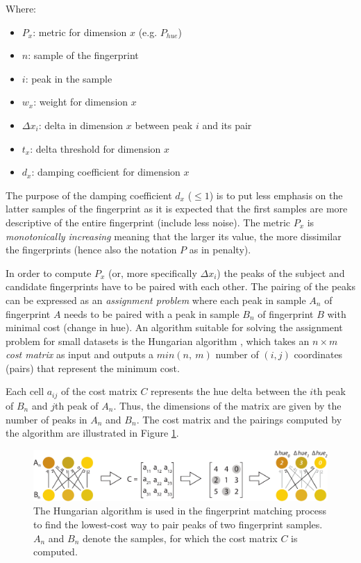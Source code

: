 \documentclass[thesis.tex]{subfiles}
\begin{document}
Where:
\begin{itemize}[label=]
    \item $P_x$: metric for dimension $x$ (e.g. $P_{hue}$)
    \item $n$: sample of the fingerprint
    \item $i$: peak in the sample
    \item $w_x$: weight for dimension $x$
    \item $\Delta{x_i}$: delta in dimension $x$ between peak $i$ and its pair
    \item $t_x$: delta threshold for dimension $x$
    \item $d_x$: damping coefficient for dimension $x$
\end{itemize}

\noindent The purpose of the damping coefficient $d_x$ ($\leq 1$) is to put less emphasis on the latter samples of the fingerprint as it is expected that the first samples are more descriptive of the entire fingerprint (include less noise). The metric $P_x$ is \emph{monotonically increasing} meaning that the larger its value, the more dissimilar the fingerprints (hence also the notation $P$ as in penalty).

In order to compute $P_x$ (or, more specifically $\Delta{x_i}$) the peaks of the subject and candidate fingerprints have to be paired with each other. The pairing of the peaks can be expressed as an \emph{assignment problem} where each peak in sample $A_n$ of fingerprint $A$ needs to be paired with a peak in sample $B_n$ of fingerprint $B$ with minimal cost (change in hue). An algorithm suitable for solving the assignment problem for small datasets is the Hungarian algorithm \cite{hungarian_algorithm}, which takes an $n \times m$ \emph{cost matrix} as input and outputs a $min (n,\ m)$ number of $(i, j)$ coordinates (pairs) that represent the minimum cost.

Each cell $a_{ij}$ of the cost matrix $C$ represents the hue delta between the $i$th peak of $B_n$ and $j$th peak of $A_n$. Thus, the dimensions of the matrix are given by the number of peaks in $A_n$ and $B_n$. The cost matrix and the pairings computed by the algorithm are illustrated in Figure \ref{figure:hungarian-algorithm}.

\begin{figure}[h]
\centering \includegraphics[width=\textwidth,height=\textheight,keepaspectratio=true]{images/design_implementation/hungarian_algorithm}
\caption{The Hungarian algorithm is used in the fingerprint matching process to find the lowest-cost way to pair peaks of two fingerprint samples. $A_n$ and $B_n$ denote the samples, for which the cost matrix $C$ is computed.\label{figure:hungarian-algorithm}}
\end{figure}
\end{document}
